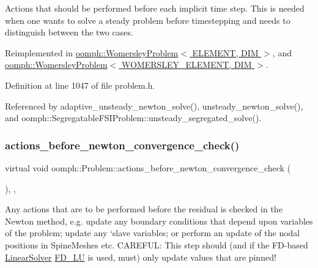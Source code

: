Actions that should be performed before each implicit time step. This is needed when one wants to solve a steady problem before timestepping and needs to distinguish between the two cases. 



Reimplemented in \hyperlink{classoomph_1_1WomersleyProblem_af87f80658aaadaee2d7c8d0c06ad159e}{oomph\+::\+Womersley\+Problem$<$ E\+L\+E\+M\+E\+N\+T, D\+I\+M $>$}, and \hyperlink{classoomph_1_1WomersleyProblem_af87f80658aaadaee2d7c8d0c06ad159e}{oomph\+::\+Womersley\+Problem$<$ W\+O\+M\+E\+R\+S\+L\+E\+Y\+\_\+\+E\+L\+E\+M\+E\+N\+T, D\+I\+M $>$}.



Definition at line 1047 of file problem.\+h.



Referenced by adaptive\+\_\+unsteady\+\_\+newton\+\_\+solve(), unsteady\+\_\+newton\+\_\+solve(), and oomph\+::\+Segregatable\+F\+S\+I\+Problem\+::unsteady\+\_\+segregated\+\_\+solve().

\mbox{\label{classoomph_1_1Problem_ae6ad96ddf5d48b517b89c9a9b879bc4b}} 
\subsubsection{\texorpdfstring{actions\+\_\+before\+\_\+newton\+\_\+convergence\+\_\+check()}{actions\_before\_newton\_convergence\_check()}}
{\footnotesize\ttfamily virtual void oomph\+::\+Problem\+::actions\+\_\+before\+\_\+newton\+\_\+convergence\+\_\+check (\begin{DoxyParamCaption}{ }\end{DoxyParamCaption})\hspace{0.3cm}{\ttfamily [inline]}, {\ttfamily [protected]}, {\ttfamily [virtual]}}



Any actions that are to be performed before the residual is checked in the Newton method, e.\+g. update any boundary conditions that depend upon variables of the problem; update any `slave\textquotesingle{} variables; or perform an update of the nodal positions in Spine\+Meshes etc. C\+A\+R\+E\+F\+UL\+: This step should (and if the F\+D-\/based \hyperlink{classoomph_1_1LinearSolver}{Linear\+Solver} \hyperlink{classoomph_1_1FD__LU}{F\+D\+\_\+\+LU} is used, must) only update values that are pinned! 



